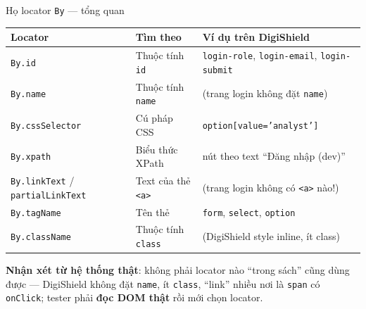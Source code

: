 \documentclass[aspectratio=169,12pt]{beamer}
\begin{document}
\begin{frame}{Họ locator \texttt{By} --- tổng quan}
  \begin{center}
  \footnotesize
  \setlength{\tabcolsep}{4pt}
  \begin{tabular}{>{\raggedright\arraybackslash}p{3.6cm}>{\raggedright\arraybackslash}p{4.0cm}>{\raggedright\arraybackslash}p{4.9cm}}
    \toprule
    \textbf{Locator} & \textbf{Tìm theo} & \textbf{Ví dụ trên DigiShield} \\
    \midrule
    \texttt{By.id} & Thuộc tính \texttt{id} & \texttt{login-role}, \texttt{login-email}, \texttt{login-submit} \\
    \texttt{By.name} & Thuộc tính \texttt{name} & (trang login không đặt \texttt{name}) \\
    \texttt{By.cssSelector} & Cú pháp CSS & \texttt{option[value='analyst']} \\
    \texttt{By.xpath} & Biểu thức XPath & nút theo text ``Đăng nhập (dev)'' \\
    \texttt{By.linkText} / \texttt{partialLinkText} & Text của thẻ \texttt{<a>} & (trang login không có \texttt{<a>} nào!) \\
    \texttt{By.tagName} & Tên thẻ & \texttt{form}, \texttt{select}, \texttt{option} \\
    \texttt{By.className} & Thuộc tính \texttt{class} & (DigiShield style inline, ít class) \\
    \bottomrule
  \end{tabular}
  \end{center}

  {\small \textbf{Nhận xét từ hệ thống thật}: không phải locator nào ``trong
  sách'' cũng dùng được --- DigiShield không đặt \texttt{name}, ít
  \texttt{class}, ``link'' nhiều nơi là \texttt{span} có \texttt{onClick};
  tester phải \textbf{đọc DOM thật} rồi mới chọn locator.}
\end{frame}
\end{document}
